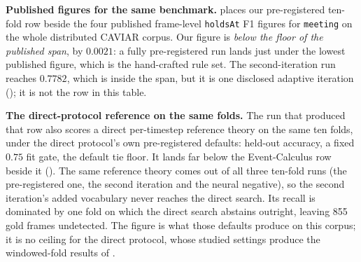 \textbf{Published figures for the same benchmark.}  places our pre-registered ten-fold row beside the four published frame-level \texttt{holdsAt} F1 figures for \texttt{meeting} on the whole distributed CAVIAR corpus. Our figure is \emph{below the floor of the published span}, by $0.0021$: a fully pre-registered run lands just under the lowest published figure, which is the hand-crafted rule set. The second-iteration run reaches $0.7782$, which is inside the span, but it is one disclosed adaptive iteration (); it is not the row in this table.

\textbf{The direct-protocol reference on the same folds.} The run that produced that row also scores a direct per-timestep reference theory on the same ten folds, under the direct protocol's own pre-registered defaults: held-out accuracy, a fixed $0.75$ fit gate, the default tie floor. It lands far below the Event-Calculus row beside it (). The same reference theory comes out of all three ten-fold runs (the pre-registered one, the second iteration and the neural negative), so the second iteration's added vocabulary never reaches the direct search. Its recall is dominated by one fold on which the direct search abstains outright, leaving 855 gold frames undetected. The figure is what those defaults produce on this corpus; it is no ceiling for the direct protocol, whose studied settings produce the windowed-fold results of .

